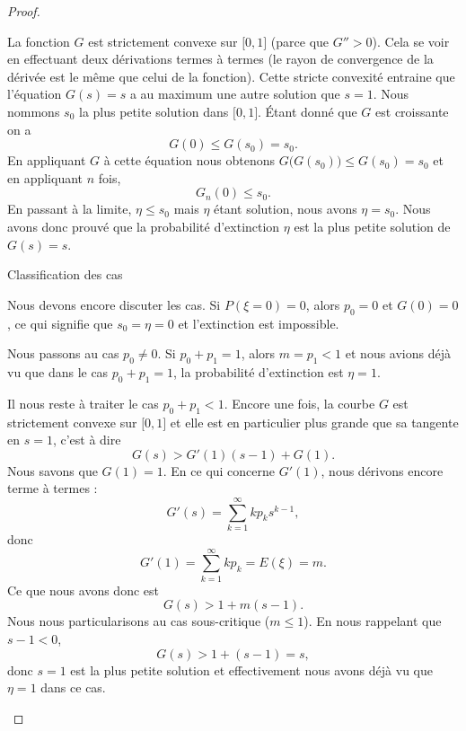 \begin{proof}
\begin{subproof}
    La fonction \( G\) est strictement convexe sur \( \mathopen[ 0 , 1 \mathclose]\) (parce que \( G''>0\)). Cela se voir en effectuant deux dérivations termes à termes (le rayon de convergence de la dérivée est le même que celui de la fonction). Cette stricte convexité entraine que l'équation \( G(s)=s\) a au maximum une autre solution que \( s=1\). Nous nommons \( s_0\) la plus petite solution dans \( \mathopen[ 0 , 1 \mathclose]\). Étant donné que \( G\) est croissante on a
    \begin{equation}
        G(0)\leq G(s_0)=s_0.
    \end{equation}
    En appliquant \( G\) à cette équation nous obtenons \( G\big( G(s_0) \big)\leq G(s_0)=s_0\) et en appliquant \( n\) fois,
    \begin{equation}
        G_n(0)\leq s_0.
    \end{equation}
    En passant à la limite, \( \eta\leq s_0\) mais \( \eta\) étant solution, nous avons \( \eta=s_0\). Nous avons donc prouvé que la probabilité d'extinction \( \eta\) est la plus petite solution de \( G(s)=s\).

\item[Classification des cas]

    Nous devons encore discuter les cas. Si \( P(\xi=0)=0\), alors \( p_0=0\) et \( G(0)=0\), ce qui signifie que \( s_0=\eta=0\) et l'extinction est impossible. 
    
    Nous passons au cas \( p_0\neq 0\). Si \( p_0+p_1=1\), alors \( m=p_1<1\) et nous avions déjà vu que dans le cas \( p_0+p_1=1\), la probabilité d'extinction est \( \eta=1\).

    Il nous reste à traiter le cas \( p_0+p_1<1\). Encore une fois, la courbe \( G\) est strictement convexe sur \( \mathopen[ 0 , 1 \mathclose]\) et elle est en particulier plus grande que sa tangente en \( s=1\), c'est à dire
    \begin{equation}
        G(s)>G'(1)(s-1)+G(1).
    \end{equation}
    Nous savons que \( G(1)=1\). En ce qui concerne \( G'(1)\), nous dérivons encore terme à termes :
    \begin{equation}
        G'(s)=\sum_{k=1}^{\infty}kp_ks^{k-1},
    \end{equation}
    donc
    \begin{equation}
        G'(1)=\sum_{k=1}^{\infty}kp_k=E(\xi)=m.
    \end{equation}
    Ce que nous avons donc est
    \begin{equation}
        G(s)>1+m(s-1).
    \end{equation}
    Nous nous particularisons au cas sous-critique (\( m\leq 1\)). En nous rappelant que \( s-1<0\),
    \begin{equation}
        G(s)>1+(s-1)=s,
    \end{equation}
    donc \( s=1\) est la plus petite solution et effectivement nous avons déjà vu que \( \eta=1\) dans ce cas.


\end{subproof}
\end{proof}

